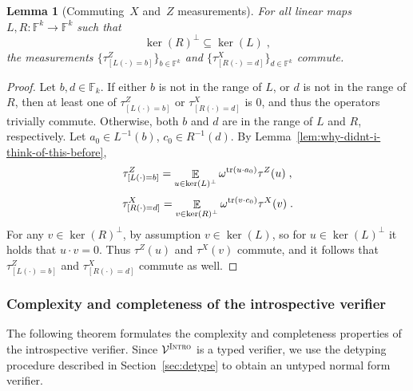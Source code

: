 \documentclass[11pt]{article}
\newtheorem{lemma}[theorem]{Lemma}
\theoremstyle{definition}
\newcommand{\F}{\ensuremath{\mathbb{F}}}
\DeclareMathOperator{\tr}{tr}
\newcommand{\E}{\mathop{\mathbb{E}}\displaylimits} %
\newcommand{\verifier}{\mathcal{V}}
\newcommand{\gamestyle}[1]{\ensuremath{\textsc{#1}}\xspace}
\newcommand{\intro}{\gamestyle{Intro}}
\begin{document}
\begin{lemma}[Commuting~$X$ and~$Z$ measurements]
  \label{lem:commute} 
	For all linear maps $L,R: \F^k \to \F^k$ such that
  \begin{equation*}
    \ker (R)^\perp \subseteq \ker (L)\;,
  \end{equation*}
  the measurements
  $\big\{ \tau^Z_{[L(\cdot)=b]} \big\}_{b\in \F^k}$ and $\big\{ \tau^X_{[R(\cdot) = d]}
  \big\}_{d\in \F^k}$ commute.
\end{lemma}
\begin{proof}
  Let $b,d\in \F_k$.
  If either $b$ is not in the range of $L$, or $d$ is not in the range of $R$,
  then at least one of $\tau^Z_{[L(\cdot) = b]}$ or $\tau^X_{[R(\cdot) = d]}$ is
  $0$, and thus the operators trivially commute.
  Otherwise, both $b$ and $d$ are in the range of $L$ and $R$, respectively.
  Let $a_0 \in L^{-1}(b)$, $c_0 \in R^{-1}(d)$.
  By Lemma~\ref{lem:why-didnt-i-think-of-this-before},
  \begin{equation*}
    \tau^Z_{[L(\cdot)=b]} = \E_{u \in \ker(L)^\perp}
    \omega^{\tr(u \cdot a_0)} \tau^Z(u)\;,
  \end{equation*}
  \begin{equation*}
    \tau^X_{[R(\cdot)=d]} = \E_{v \in \ker(R)^\perp}
    \omega^{\tr(v \cdot c_0)} \tau^X(v)\;.
  \end{equation*}
  For any $v \in \ker(R)^\perp$, by assumption $v\in \ker(L)$, so for $u \in
  \ker(L)^\perp$ it holds that $u\cdot v=0$.
  Thus $\tau^Z(u)$ and $\tau^X(v)$ commute, and it follows that
  $\tau^Z_{[L(\cdot)=b]}$ and $\tau^X_{[R(\cdot)=d]}$ commute as well.
\end{proof}

\subsubsection{Complexity and completeness of the introspective verifier}
\label{sec:comp-compl-intro}

The following theorem formulates the complexity and completeness properties of
the introspective verifier.
Since $\verifier^\intro$ is a typed verifier, we use the detyping procedure
described in Section~\ref{sec:detype} to obtain an untyped normal form verifier.
\end{document}
